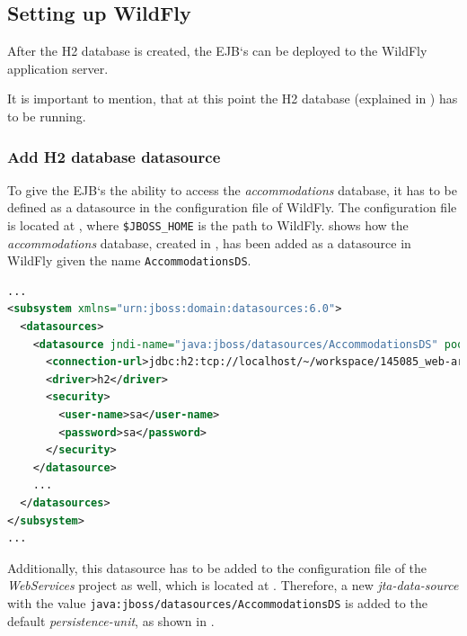 \subsection{Setting up WildFly}\label{sec:03_depl_wildfly}
After the H2 database is created, the EJB`s can be deployed to the WildFly application server.

It is important to mention, that at this point the H2 database (explained in ) has to be running.

\subsubsection{Add H2 database datasource}\label{sec:03_depl_wildfly_datasource}
To give the EJB`s the ability to access the \textit{accommodations} database, it has to be defined as a datasource in the configuration file of WildFly. The configuration file is located at , where \texttt{\$JBOSS\_HOME} is the path to WildFly. 
 shows how the \textit{accommodations} database, created in , has been added as a datasource in WildFly given the name \texttt{AccommodationsDS}.
\begin{lstlisting}[label=lst:03_depl_wildfly_datasource_config, caption=WildFly datasource configuration, language=xml]
...
<subsystem xmlns="urn:jboss:domain:datasources:6.0">
  <datasources>
    <datasource jndi-name="java:jboss/datasources/AccommodationsDS" pool-name="AccommodationsDS" enabled="true" use-java-context="true" statistics-enabled="${wildfly.datasources.statistics-enabled:${wildfly.statistics-enabled:false}}">
      <connection-url>jdbc:h2:tcp://localhost/~/workspace/145085_web-architectures/assignment_5/accommodations;DB_CLOSE_DELAY=-1;DB_CLOSE_ON_EXIT=FALSE</connection-url>
      <driver>h2</driver>
      <security>
        <user-name>sa</user-name>
        <password>sa</password>
      </security>
    </datasource>
    ...
  </datasources>
</subsystem>
...
\end{lstlisting}

Additionally, this datasource has to be added to the  configuration file of the \textit{WebServices} project as well, which is located at .
Therefore, a new \textit{jta-data-source} with the value \texttt{java:jboss/datasources/AccommodationsDS} is added to the default \textit{persistence-unit}, as shown in .

